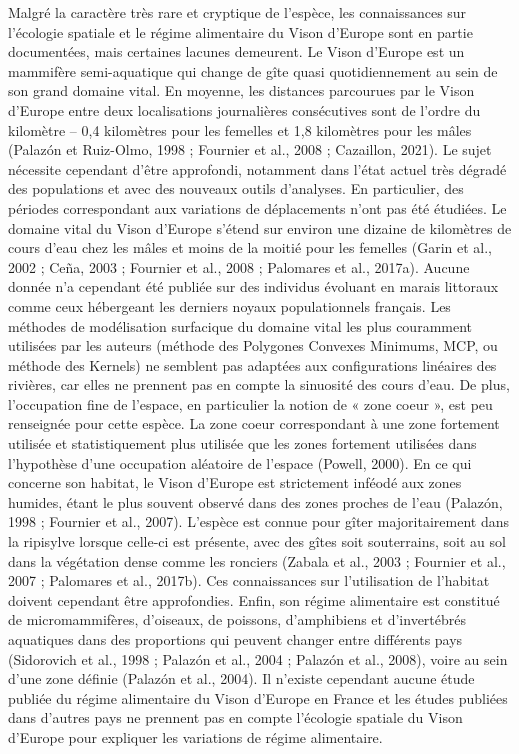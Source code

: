 \documentclass[
  letterpaper,
  DIV=11,
  numbers=noendperiod]{scrreprt}
\begin{document}
Malgré la caractère très rare et cryptique de l'espèce, les
connaissances sur l'écologie spatiale et le régime alimentaire du Vison
d'Europe sont en partie documentées, mais certaines lacunes demeurent.
Le Vison d'Europe est un mammifère semi-aquatique qui change de gîte
quasi quotidiennement au sein de son grand domaine vital. En moyenne,
les distances parcourues par le Vison d'Europe entre deux localisations
journalières consécutives sont de l'ordre du kilomètre -- 0,4 kilomètres
pour les femelles et 1,8 kilomètres pour les mâles (Palazón et
Ruiz-Olmo, 1998 ; Fournier et al., 2008 ; Cazaillon, 2021). Le sujet
nécessite cependant d'être approfondi, notamment dans l'état actuel très
dégradé des populations et avec des nouveaux outils d'analyses. En
particulier, des périodes correspondant aux variations de déplacements
n'ont pas été étudiées. Le domaine vital du Vison d'Europe s'étend sur
environ une dizaine de kilomètres de cours d'eau chez les mâles et moins
de la moitié pour les femelles (Garin et al., 2002 ; Ceña, 2003 ;
Fournier et al., 2008 ; Palomares et al., 2017a). Aucune donnée n'a
cependant été publiée sur des individus évoluant en marais littoraux
comme ceux hébergeant les derniers noyaux populationnels français. Les
méthodes de modélisation surfacique du domaine vital les plus couramment
utilisées par les auteurs (méthode des Polygones Convexes Minimums, MCP,
ou méthode des Kernels) ne semblent pas adaptées aux configurations
linéaires des rivières, car elles ne prennent pas en compte la sinuosité
des cours d'eau. De plus, l'occupation fine de l'espace, en particulier
la notion de « zone coeur », est peu renseignée pour cette espèce. La
zone coeur correspondant à une zone fortement utilisée et
statistiquement plus utilisée que les zones fortement utilisées dans
l'hypothèse d'une occupation aléatoire de l'espace (Powell, 2000). En ce
qui concerne son habitat, le Vison d'Europe est strictement inféodé aux
zones humides, étant le plus souvent observé dans des zones proches de
l'eau (Palazón, 1998 ; Fournier et al., 2007). L'espèce est connue pour
gîter majoritairement dans la ripisylve lorsque celle-ci est présente,
avec des gîtes soit souterrains, soit au sol dans la végétation dense
comme les ronciers (Zabala et al., 2003 ; Fournier et al., 2007 ;
Palomares et al., 2017b). Ces connaissances sur l'utilisation de
l'habitat doivent cependant être approfondies. Enfin, son régime
alimentaire est constitué de micromammifères, d'oiseaux, de poissons,
d'amphibiens et d'invertébrés aquatiques dans des proportions qui
peuvent changer entre différents pays (Sidorovich et al., 1998 ; Palazón
et al., 2004 ; Palazón et al., 2008), voire au sein d'une zone définie
(Palazón et al., 2004). Il n'existe cependant aucune étude publiée du
régime alimentaire du Vison d'Europe en France et les études publiées
dans d'autres pays ne prennent pas en compte l'écologie spatiale du
Vison d'Europe pour expliquer les variations de régime alimentaire.
\end{document}
